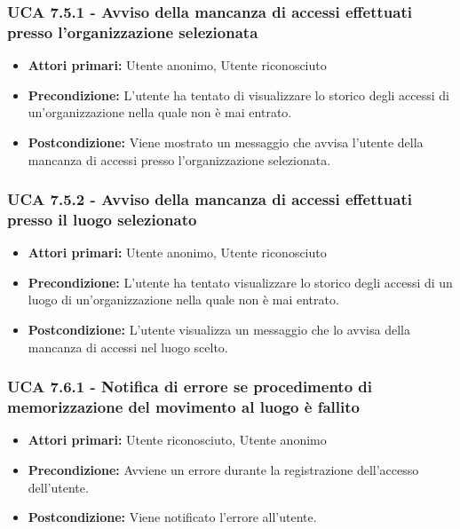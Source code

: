 \subsubsection{UCA 7.5.1 - Avviso della mancanza di accessi effettuati presso l'organizzazione selezionata}
\begin{itemize}
    \item \textbf{Attori primari:} Utente anonimo, Utente riconosciuto
    \item \textbf{Precondizione:} L'utente ha tentato di visualizzare lo storico degli accessi di un'organizzazione nella quale non è mai entrato.
    \item \textbf{Postcondizione:} Viene mostrato un messaggio che avvisa l'utente della mancanza di accessi presso l'organizzazione selezionata.
\end{itemize}

\subsubsection{UCA 7.5.2 - Avviso della mancanza di accessi effettuati presso il luogo selezionato}
\begin{itemize}
    \item \textbf{Attori primari:} Utente anonimo, Utente riconosciuto
    \item \textbf{Precondizione:} L'utente ha tentato visualizzare lo storico degli accessi di un luogo di un'organizzazione nella quale non è mai entrato.
    \item \textbf{Postcondizione:} L'utente visualizza un messaggio che lo avvisa della mancanza di accessi nel luogo scelto.
\end{itemize}

\subsubsection{UCA 7.6.1 - Notifica di errore se procedimento di memorizzazione del movimento al luogo è fallito}
\begin{itemize}
	\item \textbf{Attori primari:} Utente riconosciuto, Utente anonimo
	\item \textbf{Precondizione:} Avviene un errore durante la registrazione dell'accesso dell'utente.
	\item \textbf{Postcondizione:} Viene notificato l'errore all'utente.
\end{itemize}